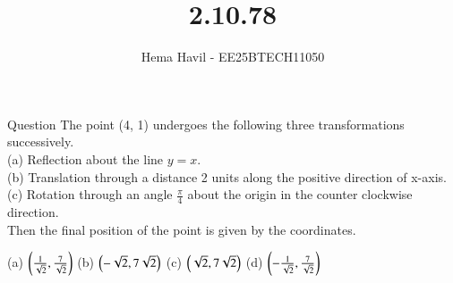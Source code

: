 \documentclass{beamer}
\title %
{2.10.78}
\author %
{Hema Havil - EE25BTECH11050}
\begin{document}
	
	\frame{\titlepage}
	\begin{frame}{Question}
		The point (4, 1) undergoes the following three transformations successively.\\
             (a) Reflection about the line $y = x$.\\
             (b) Translation through a distance 2 units along the positive direction of x-axis.\\
             (c) Rotation through an angle $\frac{\pi}{4}$ about the origin in the counter clockwise direction.\\
         Then the final position of the point is given by the coordinates.
         \begin{multicols}{2}
                (a) $\left(\frac{1}{\sqrt{2}},\frac{7}{\sqrt{2}}\right)$
                (b) $\left(-\sqrt{2},7\sqrt{2}\right)$
                (c) $\left(\sqrt{2},7\sqrt{2}\right)$
                (d) $\left(-\frac{1}{\sqrt{2}},\frac{7}{\sqrt{2}}\right)$
         \end{multicols}
	\end{frame}
\end{document}
